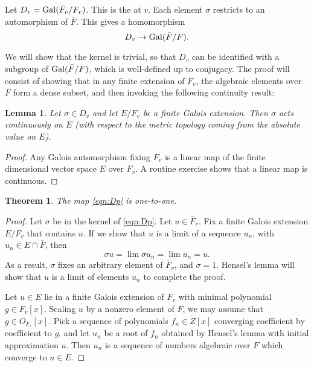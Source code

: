 \documentclass{amsart}
\newtheorem{theorem}[equation]{Theorem}
\newtheorem{lemma}[equation]{Lemma}
\begin{document}
Let $D_v = {\operatorname{Gal}}(\bar{F}_v/F_v)$.  This is the
 at $v$.  Each element $\sigma$ restricts
to an automorphism of $\bar{F}$.  This gives a homomorphism
\begin{equation}\label{eqn:Dp}
D_v\to {\operatorname{Gal}}(\bar{F}/F).
\end{equation}

We will show that the kernel is trivial, so that $D_v$ can be
identified with a subgroup of ${\operatorname{Gal}}(\bar{F}/F)$,
which is well-defined up to conjugacy.  The proof will consist of
showing that in any finite extension of $F_v$, the algebraic
elements over $F$ form a dense subset, and then invoking the
following continuity result:

\begin{lemma} Let $\sigma\in D_v$ and let $E/F_v$ be a finite Galois extension. 
Then $\sigma$ acts continuously on $E$ (with respect to the metric topology coming
from the absolute value on $E$).
\end{lemma}

\begin{proof}  Any Galois automorphism fixing $F_v$ is a linear map of
the finite dimensional vector space $E$ over $F_v$.  A routine exercise
shows that a linear map is continuous.
\end{proof}

\begin{theorem} The map \eqref{eqn:Dp} is one-to-one.
\end{theorem}

\begin{proof}
  Let $\sigma$ be in the kernel of \eqref{eqn:Dp}.  Let $u\in
  \bar{F}_v$.  Fix a finite Galois extension $E/F_v$
  that contains $u$.  If we show that $u$ is a limit of a sequence
  $u_n$, with $u_n\in E\cap \bar{F}$, then
\[
\sigma u = \lim \sigma u_n = \lim u_n = u.
\]
As a result, $\sigma$ fixes an arbitrary element of
$\bar{F}_v$, and $\sigma=1$.  Hensel's lemma will show
that $u$ is a limit of elements $u_n$ to complete the proof.


Let $u\in E$ lie in a finite Galois
extension of $F_v$ with minimal polynomial $g\in F_v[x]$.  Scaling
$u$ by a nonzero element of $F$, we may assume that $g\in O_{F_v}[x]$.  Pick a sequence
of polynomials $f_n\in\ring{Z}[x]$ converging coefficient by coefficient to 
$g$, and let $u_n$ be a root of $f_n$ obtained by Hensel's lemma with initial
approximation $u$.  Then $u_n$ is a sequence of numbers algebraic over $F$
which converge to $u\in E$.
\end{proof}
\end{document}
